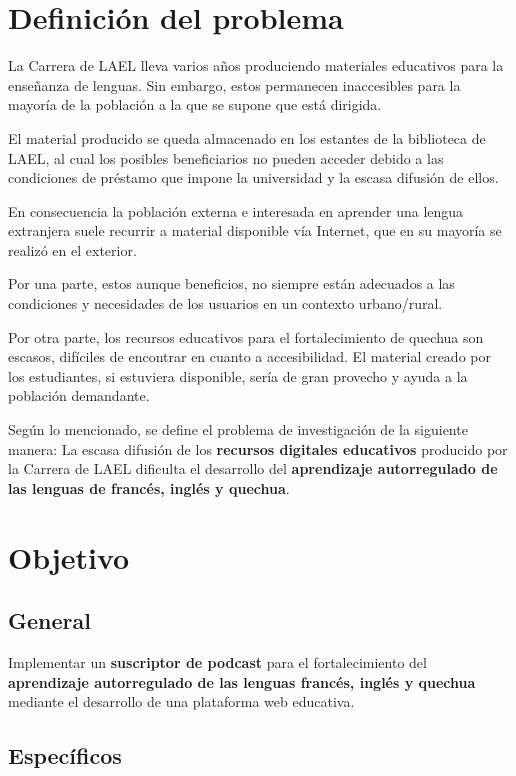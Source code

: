\section{Definición del problema}

La Carrera de LAEL lleva varios años produciendo materiales educativos para la
enseñanza de lenguas. Sin embargo, estos permanecen inaccesibles para la
mayoría de la población a la que se supone que está dirigida. 

El material producido se queda almacenado en los estantes de la biblioteca
de LAEL, al cual los posibles beneficiarios no pueden acceder debido a las
condiciones de préstamo que impone la universidad y la escasa difusión de
ellos. 

En consecuencia la población externa e interesada en aprender una lengua
extranjera suele recurrir a material disponible vía Internet, que en su
mayoría se realizó en el exterior. 

Por una parte, estos aunque beneficios, no siempre están adecuados a las
condiciones y necesidades de los usuarios en un contexto urbano/rural.

Por otra parte, los recursos educativos para el fortalecimiento de quechua
son escasos, difíciles de encontrar en cuanto a accesibilidad. El material
creado por los estudiantes, si estuviera disponible, sería de gran provecho
y ayuda a la población demandante.
 			
Según lo mencionado, se define el problema de investigación de la siguiente
manera: La escasa difusión de los \textbf{recursos digitales
educativos} producido por la Carrera de LAEL dificulta el desarrollo del 
\textbf{aprendizaje autorregulado de las lenguas de francés, inglés y quechua}.

\section{Objetivo} 

\subsection{General}

Implementar un \textbf{suscriptor de podcast} para el fortalecimiento del 
\textbf{aprendizaje autorregulado de las lenguas francés, inglés y quechua}
mediante el desarrollo de una plataforma web educativa.

\subsection{Específicos}

